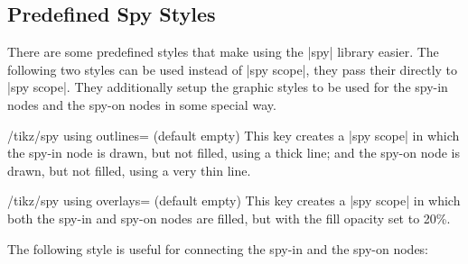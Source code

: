 \subsection{Predefined Spy Styles}

There are some predefined styles that make using the |spy| library
easier. The following two styles can be used instead of |spy scope|,
they pass their  directly to |spy scope|. They
additionally setup the graphic styles to be used for the spy-in nodes
and the spy-on nodes in some special way.

\begin{key}{/tikz/spy using outlines= (default
    \normalfont empty)}
  This key creates a |spy scope| in which the spy-in node is drawn,
  but not filled, using a thick line; and the spy-on node is drawn,
  but not filled, using a very thin line.

\begin{codeexample}[]
\end{codeexample}
\end{key}

\begin{key}{/tikz/spy using overlays= (default
    \normalfont empty)}
  This key creates a |spy scope| in which both the spy-in and spy-on
  nodes are filled, but with the fill opacity set to 20\%.

\begin{codeexample}[]
\end{codeexample}
\end{key}

The following style is useful for connecting the spy-in and the spy-on
nodes:

